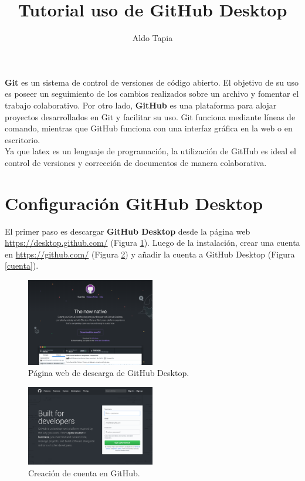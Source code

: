\documentclass[10pt]{article}
\title{Tutorial uso de GitHub Desktop}
\author{Aldo Tapia}
\begin{document}
\maketitle

\textbf{Git} es un sistema de control de versiones de código abierto. El objetivo de su uso es poseer un seguimiento de los cambios realizados sobre un archivo y fomentar el trabajo colaborativo. Por otro lado, \textbf{GitHub} es una plataforma para alojar proyectos desarrollados en Git y facilitar su uso. Git funciona mediante líneas de comando, mientras que GitHub funciona con una interfaz gráfica en la web o en escritorio.\\

Ya que latex es un lenguaje de programación, la utilización de GitHub es ideal el control de versiones y corrección de documentos de manera colaborativa.\\

\section{Configuración GitHub Desktop}

El primer paso es descargar \textbf{GitHub Desktop} desde la página web \url{https://desktop.github.com/} (Figura \ref{desktop}). Luego de la instalación, crear una cuenta en \url{https://github.com/} (Figura \ref{web}) y añadir la cuenta a GitHub Desktop (Figura \ref{cuenta}).\\

\begin{figure}[!h]
  \centering
    \includegraphics[width=0.5\textwidth]{Figuras/desktop.png}
  \caption{Página web de descarga de GitHub Desktop.}
  \label{desktop}
\end{figure}

\begin{figure}[!h]
  \centering
    \includegraphics[width=0.5\textwidth]{Figuras/web.png}
  \caption{Creación de cuenta en GitHub.}
  \label{web}
\end{figure}
\end{document}

